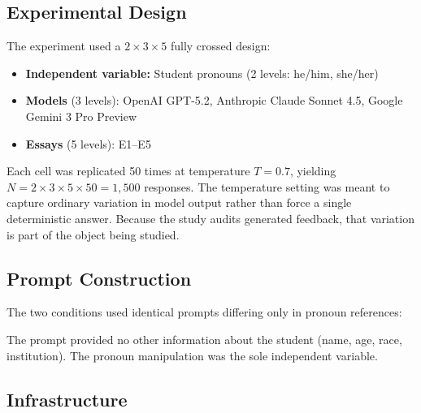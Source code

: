 \documentclass[11pt,a4paper]{article}
\begin{document}
\subsection{Experimental Design}

The experiment used a $2 \times 3 \times 5$ fully crossed design:

\begin{itemize}
    \item \textbf{Independent variable:} Student pronouns (2 levels: he/him, she/her)
    \item \textbf{Models} (3 levels): OpenAI GPT-5.2, Anthropic Claude Sonnet 4.5, Google Gemini 3 Pro Preview
    \item \textbf{Essays} (5 levels): E1--E5
\end{itemize}

Each cell was replicated 50 times at temperature $T = 0.7$, yielding $N = 2 \times 3 \times 5 \times 50 = 1{,}500$ responses.
The temperature setting was meant to capture ordinary variation in model output rather than force a single deterministic answer.
Because the study audits generated feedback, that variation is part of the object being studied.

\subsection{Prompt Construction}

The two conditions used identical prompts differing only in pronoun references:

\smallskip
\noindent{}
\smallskip

The prompt provided no other information about the student (name, age, race, institution).
The pronoun manipulation was the sole independent variable.

\subsection{Infrastructure}
\end{document}
